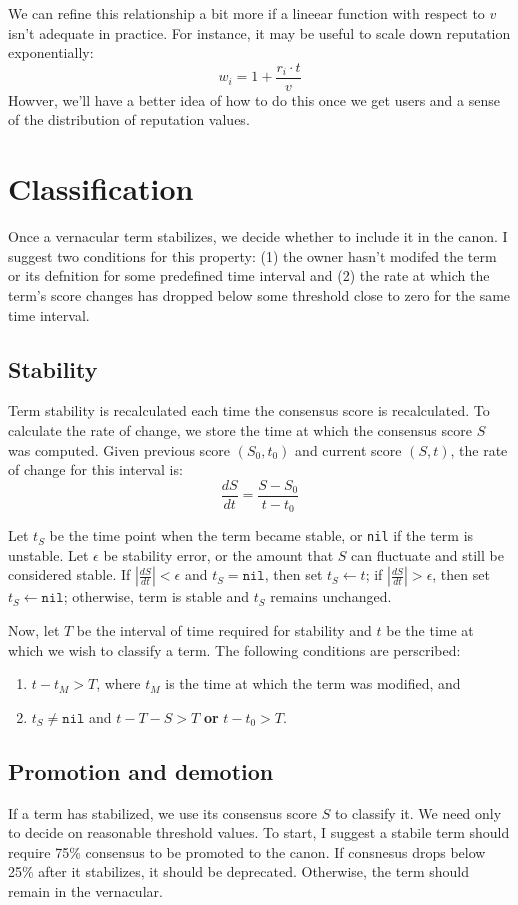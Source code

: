 \documentclass[letter]{article}
\begin{document}
We can refine this relationship a bit more if a lineear function with respect to $v$ isn't adequate
in practice. For instance, it may be useful to scale down reputation exponentially: 
$$ w_i = 1 + \frac{r_i \cdot t}{v} $$
Howver, we'll have a better idea of how to do this once we get users and a sense of the distribution 
of reputation values. 

\section{Classification}
Once a vernacular term stabilizes, we decide whether to include it in the canon. I suggest two 
conditions for this property: (1) the owner hasn't modifed the term or its defnition for some 
predefined time interval and (2) the rate at which the term's score changes has dropped below some
threshold close to zero for the same time interval. 

\subsection{Stability}
Term stability is recalculated each time the consensus score is recalculated. 
To calculate the rate of change, we store the time at which the consensus score $S$ was computed. 
Given previous score $(S_0, t_0)$ and current score $(S, t)$, the rate of change for this 
interval is: 
$$ \frac{dS}{dt} = \frac{S - S_0}{t - t_0} $$

Let $t_S$ be the time point when the term became stable, or \texttt{nil} if the term is unstable. 
Let $\epsilon $ be stability error, or the amount that $S$ can fluctuate and still be considered 
stable. If $| \frac{dS}{dt} | < \epsilon $ and $t_S = \texttt{nil}$, then set $t_S \leftarrow t$; 
if $| \frac{dS}{dt} | > \epsilon$, then set $t_S \leftarrow \texttt{nil}$; otherwise, term is 
stable and $t_S$ remains unchanged.

Now, let $T$ be the interval of time required for stability and $t$ be the time at which we 
wish to classify a term. The following conditions are perscribed: 
\begin{enumerate}
\item $t - t_M > T$, where $t_M$ is the time at which the term was modified, and 
\item $t_S \ne \texttt{nil}$ and $t - T-S > T$ \textbf{or} $t - t_0 > T$.
\end{enumerate}

\subsection{Promotion and demotion}
If a term has stabilized, we use its consensus score $S$ to classify it. 
We need only to decide on reasonable threshold values. To start, I suggest a stabile term should 
require 75\% consensus to be promoted to the canon. If consnesus drops below 25\% after it stabilizes, 
it should be deprecated. Otherwise, the term should remain in the vernacular. 
\end{document}
